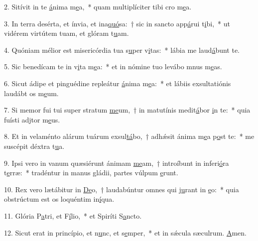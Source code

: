 2. Sitívit in te \uline{á}nima m\uline{e}a,~* quam multiplíciter tibi cro m\uline{e}a.\par 
3. In terra desérta, et ínvia, et ina\uline{quó}sa:~† sic in sancto app\uline{á}rui t\uline{i}bi,~* ut vidérem virtútem tuam, et glóram t\uline{u}am.\par 
4. Quóniam mélior est misericórdia tua s\uline{u}per v\uline{i}tas:~* lábia me laud\uline{á}bunt te.\par 
5. Sic benedícam te in v\uline{i}ta m\uline{e}a:~* et in nómine tuo levábo mnus m\uline{e}as.\par 
6. Sicut ádipe et pinguédine repleátur \uline{á}nima m\uline{e}a:~* et lábiis exsultatiónis laudábt os m\uline{e}um.\par 
7. Si memor fui tui super stratum \uline{me}um,~† in matutínis medit\uline{á}bor \uline{i}n te:~* quia fuísti adjtor m\uline{e}us.\par 
8. Et in velaménto alárum tuárum exsul\uline{tá}bo,~† adhǽsit ánima m\uline{e}a p\uline{o}st te:~* me suscépit déxtra t\uline{u}a.\par 
9. Ipsi vero in vanum quæsiérunt ánimam \uline{me}am,~† introíbunt in inferi\uline{ó}ra t\uline{e}rræ:~* tradéntur in manus gládii, partes vúlpum \uline{e}runt.\par 
10. Rex vero lætábitur in \uline{De}o,~† laudabúntur omnes qui j\uline{u}rant in \uline{e}o:~* quia obstrúctum est os loquéntim in\uline{í}qua.\par 
11. Glória P\uline{a}tri, et F\uline{í}lio,~* et Spiríti S\uline{a}ncto.\par 
12. Sicut erat in princípio, et n\uline{u}nc, et s\uline{e}mper,~* et in sǽcula sæculrum. \uline{A}men.\par 
